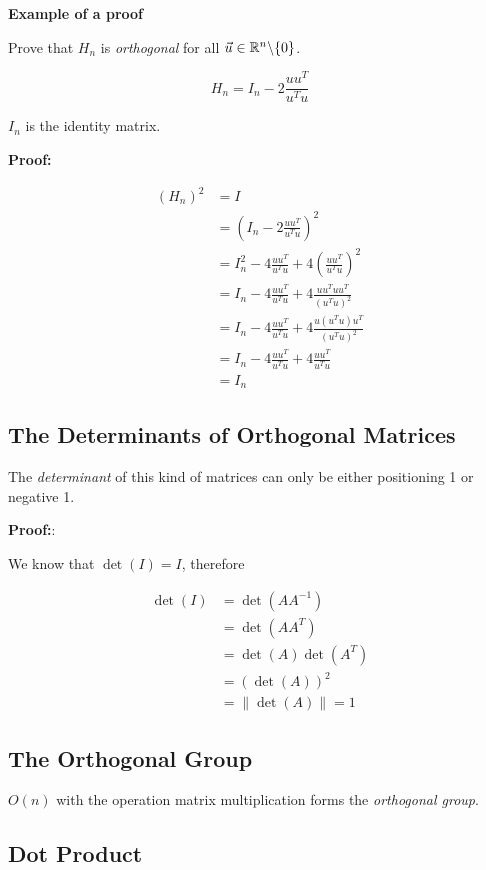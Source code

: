 \textbf{Example of a proof}

Prove that \(H_n\) is \emph{orthogonal} for all \(\vec{u}\in \mathbb{R}^n \backslash \{0\} \).

\[
    H_n = I_n - 2 \frac{uu^T}{u^Tu}
\]

\(I_n\) is the identity matrix.

\textbf{Proof:}

\begin{align*}
    (H_n)^2 &= I \\
    &= \left(I_n - 2 \frac{uu^T}{u^Tu}\right)^2\\
    &= I_n^2 - 4\frac{uu^T}{u^Tu} + 4\left(\frac{uu^T}{u^Tu}\right)^2\\
    &= I_n -4\frac{uu^T}{u^Tu} +4\frac{uu^T uu^T}{(u^Tu)^2}\\ 
    &= I_n -4\frac{uu^T}{u^Tu} +4\frac{u(u^T u)u^T}{(u^Tu)^2}\\ 
    &= I_n -4\frac{uu^T}{u^Tu} +4\frac{uu^T}{u^Tu}\\ 
    &= I_n
\end{align*}

\QED

\subsection{The Determinants of Orthogonal Matrices}

The \emph{determinant} of this kind of matrices can only be either positioning 1 or negative 1.

\textbf{Proof:}:

We know that \(\det(I) = I \), therefore

\begin{align*}
    \det(I) &= \det(A A^{-1}) \\
            &= \det(A A^T) \\
            &= \det(A) \det(A^T) \\
            &= (\det(A))^2 \\
            &= \|\det (A) \| = 1
\end{align*}

\QED

\subsection{The Orthogonal Group}

\(O(n)\) with the operation matrix multiplication forms the \emph{orthogonal group}.

\subsection{Dot Product}

